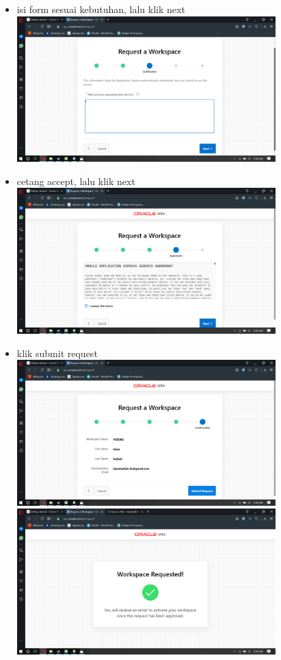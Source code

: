 \documentclass[a4paper,12pt]{report}
\begin{document}
\begin{itemize}
	\item isi form sesuai kebutuhan, lalu klik next\\	\includegraphics[width=10cm]{gambar/Screenshot (110).png} 
	\item cetang accept, lalu klik next\\	\includegraphics[width=10cm]{gambar/Screenshot (111).png} 
	\item klik submit request\\	\includegraphics[width=10cm]{gambar/Screenshot (112).png} \\	\includegraphics[width=10cm]{gambar/Screenshot (113).png} 

\end{itemize}
\end{document}
